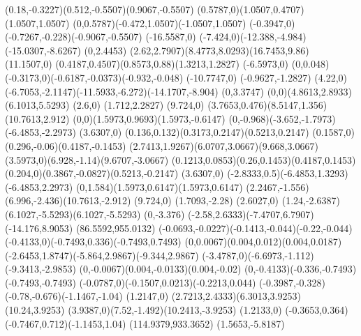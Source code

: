 {    \rcurveto(0.18,-0.3227)(0.512,-0.5507)(0.9067,-0.5507)
    \rcurveto(0.5787,0)(1.0507,0.4707)(1.0507,1.0507)
    \rcurveto(0,0.5787)(-0.472,1.0507)(-1.0507,1.0507)
    \rcurveto(-0.3947,0)(-0.7267,-0.228)(-0.9067,-0.5507)
    \rlineto(-16.5587,0)
    \rcurveto(-7.424,0)(-12.388,-4.984)(-15.0307,-8.6267)
    \rlineto(0,2.4453)
    \rcurveto(2.62,2.7907)(8.4773,8.0293)(16.7453,9.86)
    \rlineto(11.1507,0)
    \rcurveto(0.4187,0.4507)(0.8573,0.88)(1.3213,1.2827)
    \rlineto(-6.5973,0)
    \rlineto(0,0.048)
    \rcurveto(-0.3173,0)(-0.6187,-0.0373)(-0.932,-0.048)
    \rlineto(-10.7747,0)
    \rlineto(-0.9627,-1.2827)
    \rlineto(4.22,0)
    \rcurveto(-6.7053,-2.1147)(-11.5933,-6.272)(-14.1707,-8.904)
    \rlineto(0,3.3747)
    \rcurveto(0,0)(4.8613,2.8933)(6.1013,5.5293)
    \rlineto(2.6,0)
    \rlineto(1.712,2.2827)
    \rlineto(9.724,0)
    \rcurveto(3.7653,0.476)(8.5147,1.356)(10.7613,2.912)
    \rcurveto(0,0)(1.5973,0.9693)(1.5973,-0.6147)
    \rcurveto(0,-0.968)(-3.652,-1.7973)(-6.4853,-2.2973)
    \rlineto(3.6307,0)
    \rcurveto(0.136,0.132)(0.3173,0.2147)(0.5213,0.2147)
    \rcurveto(0.1587,0)(0.296,-0.06)(0.4187,-0.1453)
    \rcurveto(2.7413,1.9267)(6.0707,3.0667)(9.668,3.0667)
    \rcurveto(3.5973,0)(6.928,-1.14)(9.6707,-3.0667)
    \rcurveto(0.1213,0.0853)(0.26,0.1453)(0.4187,0.1453)
    \rcurveto(0.204,0)(0.3867,-0.0827)(0.5213,-0.2147)
    \rlineto(3.6307,0)
    \rcurveto(-2.8333,0.5)(-6.4853,1.3293)(-6.4853,2.2973)
    \rcurveto(0,1.584)(1.5973,0.6147)(1.5973,0.6147)
    \rcurveto(2.2467,-1.556)(6.996,-2.436)(10.7613,-2.912)
    \rlineto(9.724,0)
    \rlineto(1.7093,-2.28)
    \rlineto(2.6027,0)
    \rcurveto(1.24,-2.6387)(6.1027,-5.5293)(6.1027,-5.5293)
    \rlineto(0,-3.376)
    \rcurveto(-2.58,2.6333)(-7.4707,6.7907)(-14.176,8.9053)
    \moveto(86.5592,955.0132)
    \rcurveto(-0.0693,-0.0227)(-0.1413,-0.044)(-0.22,-0.044)
    \rcurveto(-0.4133,0)(-0.7493,0.336)(-0.7493,0.7493)
    \rcurveto(0,0.0067)(0.004,0.012)(0.004,0.0187)
    \rcurveto(-2.6453,1.8747)(-5.864,2.9867)(-9.344,2.9867)
    \rcurveto(-3.4787,0)(-6.6973,-1.112)(-9.3413,-2.9853)
    \rcurveto(0,-0.0067)(0.004,-0.0133)(0.004,-0.02)
    \rcurveto(0,-0.4133)(-0.336,-0.7493)(-0.7493,-0.7493)
    \rcurveto(-0.0787,0)(-0.1507,0.0213)(-0.2213,0.044)
    \rcurveto(-0.3987,-0.328)(-0.78,-0.676)(-1.1467,-1.04)
    \rlineto(1.2147,0)
    \rcurveto(2.7213,2.4333)(6.3013,3.9253)(10.24,3.9253)
    \rcurveto(3.9387,0)(7.52,-1.492)(10.2413,-3.9253)
    \rlineto(1.2133,0)
    \rcurveto(-0.3653,0.364)(-0.7467,0.712)(-1.1453,1.04)
    \moveto(114.9379,933.3652)
    \rlineto(1.5653,-5.8187)
}
